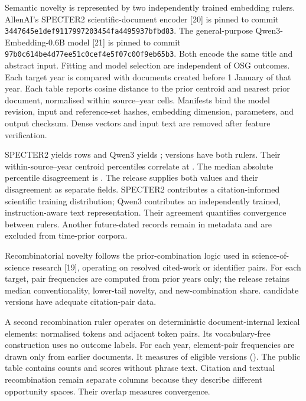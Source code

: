 \documentclass[
  10pt,
]{article}
\begin{document}
Semantic novelty is represented by two independently trained embedding
rulers. AllenAI's SPECTER2 scientific-document encoder {[}20{]} is pinned
to commit \nolinkurl{3447645e1def9117997203454fa4495937bfbd83}. The
general-purpose Qwen3-Embedding-0.6B model {[}21{]} is pinned to commit
\nolinkurl{97b0c614be4d77ee51c0cef4e5f07c00f9eb65b3}. Both encode the same
title and abstract input. Fitting and model selection are independent of
OSG outcomes. Each target year is compared with documents created before
1 January of that year. Each table reports cosine distance to the prior centroid and
nearest prior document, normalised within source--year cells. Manifests
bind the model revision, input and reference-set hashes, embedding
dimension, parameters, and output checksum. Dense vectors and input text
are removed after feature verification.

SPECTER2 yields \OSGClaimSemanticFeatureRows{} rows and Qwen3 yields
\OSGClaimQwenThreeSemanticRows{}; \OSGClaimSemanticRulerSharedRows{} versions
have both rulers.
Their within-source--year centroid percentiles correlate at
\OSGClaimSemanticRulerCentroidSpearman{}. The median absolute percentile
disagreement is \OSGClaimSemanticRulerMedianDisagreement{}. The release
supplies both values and their disagreement as separate fields.
SPECTER2 contributes a
citation-informed scientific training distribution; Qwen3 contributes
an independently trained, instruction-aware text representation. Their
agreement quantifies convergence between rulers. Another
\OSGClaimFutureDatedExclusions{} future-dated records remain in metadata
and are excluded from time-prior corpora.

Recombinatorial novelty follows the prior-combination logic used in
science-of-science research {[}19{]}, operating on resolved cited-work or
identifier pairs. For each target, pair frequencies are computed from prior years
only; the release retains median conventionality, lower-tail novelty,
and new-combination share. \OSGClaimRecombinatorialVersions{} candidate
versions have adequate citation-pair data.

A second recombination ruler operates on deterministic document-internal
lexical elements: normalised tokens and adjacent token pairs. Its
vocabulary-free construction uses no outcome labels.
For each year, element-pair frequencies are drawn only from earlier
documents. It measures \OSGClaimTextualRecombinatorialVersions{} of
\OSGClaimTextualRecombinatorialDocuments{}
eligible versions (\OSGClaimTextualRecombinatorialCoveragePercent{}).
The public table contains counts and scores without phrase text.
Citation and textual recombination remain separate columns because they
describe different opportunity spaces. Their overlap measures
convergence.
\end{document}
